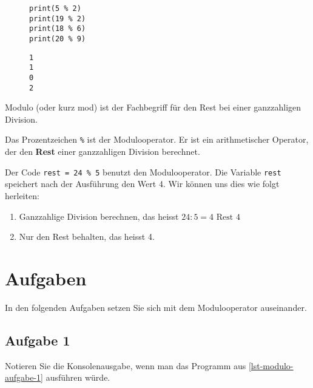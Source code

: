 \begin{figure}[htb]
\begin{minipage}{0.45\textwidth}
\begin{lstlisting}[label={lst-modulo-example}, caption={Das Prozentzeichen ist der Modoluooperator.}]
print(5 % 2)
print(19 % 2)
print(18 % 6)
print(20 % 9)
\end{lstlisting}
\end{minipage}
\hfill
\begin{minipage}{0.45\textwidth}
\begin{lstlisting}[language=output, label={lst-modulo-example-output}, caption={Reste der ganzzahligen Divisionen.}]
1
1
0
2
\end{lstlisting}
\end{minipage}
\end{figure}

Modulo (oder kurz mod) ist der Fachbegriff für den Rest bei einer ganzzahligen Division.

\begin{definition}[Modulooperator]
Das Prozentzeichen \lstinline{%}
ist der Modulooperator. Er ist ein arithmetischer Operator, der den \textbf{Rest} einer ganzzahligen Division berechnet.
\end{definition}

\begin{example}
Der Code \lstinline{rest = 24 % 5} 
benutzt den Modulooperator. Die Variable \lstinline{rest} speichert nach der Ausführung den Wert \num{4}. Wir können uns dies wie folgt herleiten:
\begin{enumerate}
\item Ganzzahlige Division berechnen, das heisst $24 : 5 = 4 \text{ Rest } 4$
\item Nur den Rest behalten, das heisst \num{4}.
\end{enumerate}
\end{example}

\section{Aufgaben}

In den folgenden Aufgaben setzen Sie sich mit dem Modulooperator auseinander.

\subsection{Aufgabe 1}

Notieren Sie die Konsolenausgabe, wenn man das Programm aus \autoref{lst-modulo-aufgabe-1} ausführen würde.

